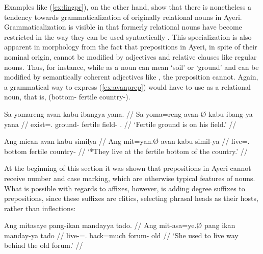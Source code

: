 Examples like (\ref{ex:lingpr}), on the other hand, show that there is
nonetheless a tendency towards grammaticalization of originally relational
nouns in Ayeri. Grammaticalization is visible in that formerly relational nouns
have become restricted in the way they can be used syntactically
\citep[174]{lehmann2015}. This specialization is also apparent in morphology
from the fact that prepositions in Ayeri, in spite of their nominal origin,
cannot be modified by adjectives and relative clauses like regular nouns. Thus,
for instance, while  as a noun can mean `soil' or `ground' and
can be modified by semantically coherent adjectives like
, the preposition  cannot. Again, a
grammatical way to express (\ref{ex:avanprep}) would have to use
 as a relational noun, that is, 
(bottom-\Loc{} fertile country-\Gen{}).

\pex
\a\label{ex:avannn}\begingl
	\gla Sa yomareng avan kabu ibangya yana. //
	\glb Sa yoma=reng avan-Ø kabu ibang-ya yana //
	\glc \PatT{} exist=\TsgI.\AargI{} ground-\Top{} fertile field-\Loc{} 
		\TsgM{}.\Gen{} //
	\glft `Fertile ground is on his field.' //
\endgl

\a\label{ex:avanprep}\ljudge* \begingl
	\gla Ang mican avan kabu similya //
	\glb Ang mit=yan.Ø avan kabu simil-ya //
	\glc \AgtT{} live=\TplM{}.\Top{} bottom fertile country-\Loc{} //
	\glft `*They live at the fertile bottom of the country.' //
\endgl

\xe

At the beginning of this section it was shown that prepositions in Ayeri cannot
receive number and case marking, which are otherwise typical features of nouns.
What is possible with regards to affixes, however, is adding degree suffixes to
prepositions, since these suffixes are clitics, selecting phrasal heads as
their hosts, rather than inflections:

\ex\label{ex:prepquant}\begingl
	\gla Ang mitasaye pang-ikan mandayya tado. //
	\glb Ang mit-asa=ye.Ø pang ikan manday-ya tado //
	\glc \AgtT{} live-\Hab{}=\TsgF{}.\Top{} back=much forum-\Loc{} old //
	\glft `She used to live way behind the old forum.' //
\endgl\xe

